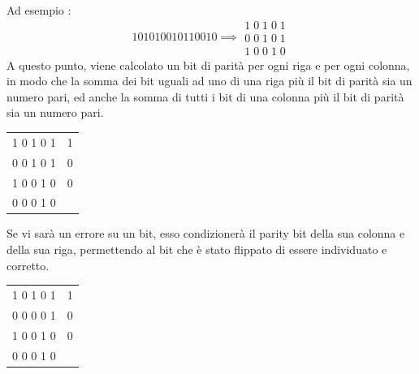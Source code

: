 \documentclass[12pt, letterpaper]{article}
\begin{document}
Ad esempio : $$ 10101 00101 10010   \implies \begin{matrix}
    1\;0\;1\;0\;1\\ 0\;0\;1\;0\;1 \\1\;0\;0\;1\;0 
\end{matrix}$$
A questo punto, viene calcolato un bit di parità per ogni riga e per ogni colonna, in modo che la somma dei bit 
uguali ad uno  
di una riga più il bit di parità sia un numero pari, ed anche la somma di tutti i bit di 
una colonna più il bit di parità sia un numero pari.\begin{center}
    \begin{tabular}{l|l}
        1 0 1 0 1  & 1 \\
        0 0 1 0 1  & 0 \\
        1 0 0 1 0 & 0 \\ \hline
        0 0 0 1 0  &  
        \end{tabular}
\end{center}
Se vi sarà un errore su un bit, esso condizionerà il parity bit della sua colonna e della sua riga, permettendo 
al bit che è stato flippato di essere individuato e corretto.
\begin{center}
    \begin{tabular}{l|l}
        1 0 1 0 1  & 1 \\
        0 0 \color{red}0 \color{black} 0 1  & \color{red}0\color{black} \\
        1 0 0 1 0 & 0 \\ \hline
        0 0 \color{red}0 \color{black} 1 0  &  
        \end{tabular}
\end{center}
\end{document}
